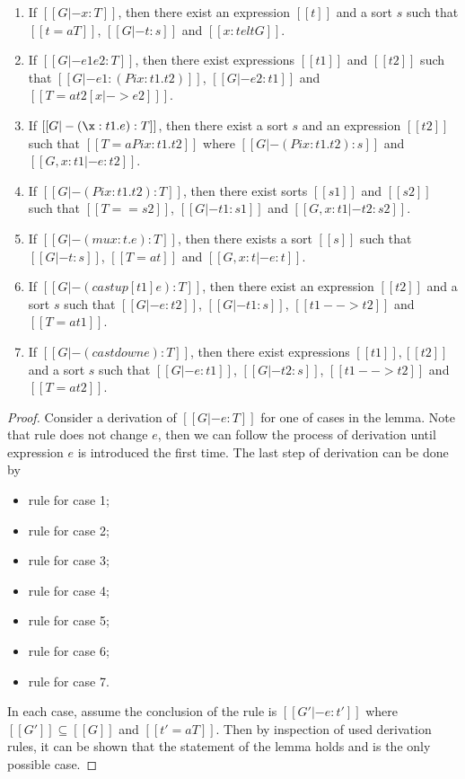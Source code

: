 \begin{lem}\label{lem:gen}
$\quad$
\begin{enumerate}[(1)]
	\item If $[[G |- x:T]]$, then there exist an expression $[[t]]$ and a sort $s$ such that $[[t =a T]]$, $[[G |- t:s]]$ and $[[x:t elt G]]$.
	\item If $[[G |- e1 e2:T]]$, then there exist expressions $[[t1]]$ and $[[t2]]$ such that $[[G |- e1 : (Pi x:t1.t2)]]$, $[[G |- e2:t1]]$ and $[[T =a t2[x |-> e2] ]]$.
	\item If $[[G |- (\x:t1.e):T]]$, then there exist a sort $s$ and an expression $[[t2]]$ such that $[[T =a Pi x:t1.t2]]$ where $[[G |- (Pi x:t1.t2):s]]$ and $[[G,x:t1 |- e:t2]]$.
	\item If $[[G |- (Pi x:t1.t2):T]]$, then there exist sorts $[[s1]]$ and $[[s2]]$ such that $[[T == s2]]$, $[[G |- t1:s1]]$ and $[[G, x:t1 |- t2:s2]]$.
	\item If $[[G |- (mu x:t.e):T]]$, then there exists a sort $[[s]]$ such that $[[G |- t:s]]$, $[[T =a t]]$ and $[[G, x:t|-e:t]]$.
	\item If $[[G |- (castup [t1] e):T]]$, then there exist an expression $[[t2]]$ and a sort $s$ such that $[[G |- e:t2]]$, $[[G |- t1:s]]$, $[[t1 --> t2]]$ and $[[T =a t1]]$.
	\item If $[[G |- (castdown e):T]]$, then there exist expressions $[[t1]],[[t2]]$ and a sort $s$ such that $[[G |- e:t1]]$, $[[G |- t2:s]]$, $[[t1 --> t2]]$ and $[[T =a t2]]$.
\end{enumerate}
\end{lem}

\begin{proof}
    Consider a derivation of $[[G |- e:T]]$ for one of cases in the lemma. Note that rule  does not change $e$, then we can follow the process of derivation until expression $e$ is introduced the first time. The last step of derivation can be done by
    \begin{itemize}
        \item rule  for case 1;
        \item rule  for case 2;
        \item rule  for case 3;
        \item rule  for case 4;
        \item rule  for case 5;
        \item rule  for case 6;
        \item rule  for case 7.
    \end{itemize}
    In each case, assume the conclusion of the rule is $[[G' |- e : t']]$ where $[[G']] \subseteq [[G]]$ and $[[t' =a T]]$. Then by inspection of used derivation rules, it can be shown that the statement of the lemma holds and is the only possible case.
\end{proof}

